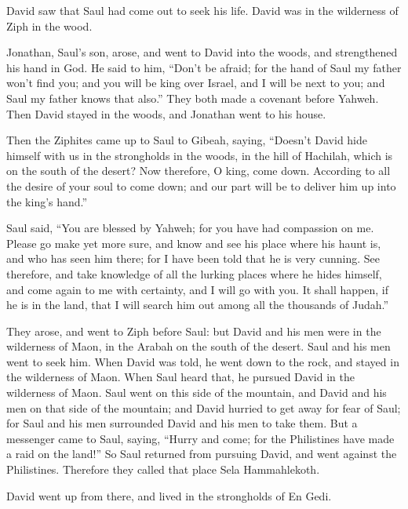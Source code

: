 {David saw that Saul had come out to seek his life. David was in the wilderness of Ziph in the wood.
\par }{\PP {}Jonathan, Saul’s son, arose, and went to David into the woods, and strengthened his hand in God.
He said to him, “Don’t be afraid; for the hand of Saul my father won’t find you; and you will be king over Israel, and I will be next to you; and Saul my father knows that also.”
They both made a covenant before Yahweh. Then David stayed in the woods, and Jonathan went to his house.
\par }{\PP {}Then the Ziphites came up to Saul to Gibeah, saying, “Doesn’t David hide himself with us in the strongholds in the woods, in the hill of Hachilah, which is on the south of the desert?
Now therefore, O king, come down. According to all the desire of your soul to come down; and our part will be to deliver him up into the king’s hand.”
\par }{\PP {}Saul said, “You are blessed by Yahweh; for you have had compassion on me.
Please go make yet more sure, and know and see his place where his haunt is, and who has seen him there; for I have been told that he is very cunning.
See therefore, and take knowledge of all the lurking places where he hides himself, and come again to me with certainty, and I will go with you. It shall happen, if he is in the land, that I will search him out among all the thousands of Judah.”
\par }{\PP {}They arose, and went to Ziph before Saul: but David and his men were in the wilderness of Maon, in the Arabah on the south of the desert.
Saul and his men went to seek him. When David was told, he went down to the rock, and stayed in the wilderness of Maon. When Saul heard that, he pursued David in the wilderness of Maon.
Saul went on this side of the mountain, and David and his men on that side of the mountain; and David hurried to get away for fear of Saul; for Saul and his men surrounded David and his men to take them.
But a messenger came to Saul, saying, “Hurry and come; for the Philistines have made a raid on the land!”
So Saul returned from pursuing David, and went against the Philistines. Therefore they called that place Sela Hammahlekoth.
\par }{\PP {}David went up from there, and lived in the strongholds of En Gedi.

}
